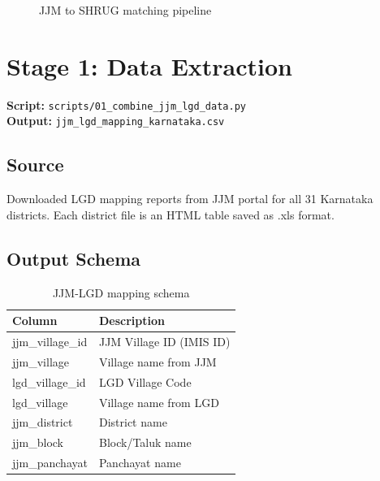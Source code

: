 \documentclass[11pt,a4paper]{article}
\begin{document}
\begin{figure}[h]
\caption{JJM to SHRUG matching pipeline}
\end{figure}

\section{Stage 1: Data Extraction}

\textbf{Script:} \texttt{scripts/01\_combine\_jjm\_lgd\_data.py}\\
\textbf{Output:} \texttt{jjm\_lgd\_mapping\_karnataka.csv}

\subsection{Source}
Downloaded LGD mapping reports from JJM portal for all 31 Karnataka districts. Each district file is an HTML table saved as .xls format.

\subsection{Output Schema}
\begin{table}[h]
\centering
\begin{tabular}{ll}
\toprule
\textbf{Column} & \textbf{Description} \\
\midrule
jjm\_village\_id & JJM Village ID (IMIS ID) \\
jjm\_village & Village name from JJM \\
lgd\_village\_id & LGD Village Code \\
lgd\_village & Village name from LGD \\
jjm\_district & District name \\
jjm\_block & Block/Taluk name \\
jjm\_panchayat & Panchayat name \\
\bottomrule
\end{tabular}
\caption{JJM-LGD mapping schema}
\end{table}
\end{document}
